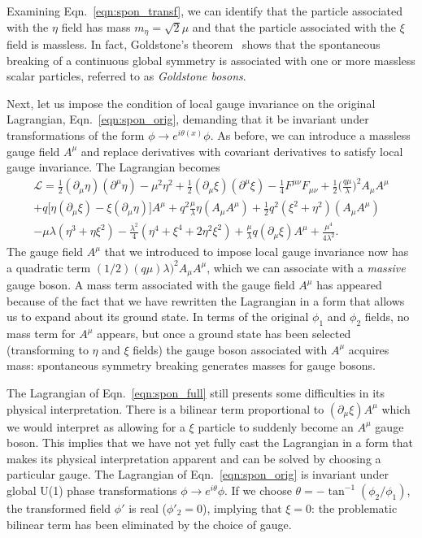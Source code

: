 Examining Eqn.~\ref{eqn:spon_transf}, we can identify that the particle associated with the $\eta$ field has mass $m_\eta = \sqrt{2} \mu$ and that the particle associated with the $\xi$ field is massless.
In fact, Goldstone's theorem~\cite{Goldstone:1962es} shows that the spontaneous breaking of a continuous global symmetry is associated with one or more massless scalar particles, referred to as \emph{Goldstone bosons}.

Next, let us impose the condition of local gauge invariance on the original Lagrangian, Eqn.~\ref{eqn:spon_orig}, demanding that it be invariant under transformations of the form $\phi \to e^{i \theta(x)} \phi$.
As before, we can introduce a massless gauge field $A^\mu$ and replace derivatives with covariant derivatives to satisfy local gauge invariance.
The Lagrangian becomes
\begin{multline} \label{eqn:spon_full}
    \mathcal L = \frac{1}{2} (\partial_\mu \eta)(\partial^\mu \eta) - \mu^2 \eta^2 + \frac{1}{2} (\partial_\mu \xi)(\partial^\mu \xi) 
    - \frac{1}{4} F^{\mu\nu} F_{\mu\nu} + \frac{1}{2} \bigg(\frac{q\mu}{\lambda}\bigg)^2 A_\mu A^\mu \\
    + q \Big[ \eta(\partial_\mu \xi) - \xi (\partial_\mu \eta) \Big] A^\mu + q^2 \frac{\mu}{\lambda} \eta (A_\mu A^\mu)
    + \frac{1}{2} q^2 (\xi^2 + \eta^2)(A_\mu A^\mu) \\
    - \mu \lambda(\eta^3 + \eta \xi^2) - \frac{\lambda^2}{4}(\eta^4 + \xi^4 + 2 \eta^2 \xi^2) 
    + \frac{\mu}{\lambda}q (\partial_\mu \xi) A^\mu
    + \frac{\mu^4}{4 \lambda^2}.
\end{multline}
The gauge field $A^\mu$ that we introduced to impose local gauge invariance now has a quadratic term $(1/2) (q\mu)\lambda)^2 A_\mu A^\mu$, which we can associate with a \emph{massive} gauge boson.
A mass term associated with the gauge field $A^\mu$ has appeared because of the fact that we have rewritten the Lagrangian in a form that allows us to expand about its ground state.
In terms of the original $\phi_1$ and $\phi_2$ fields, no mass term for $A^\mu$ appears, but once a ground state has been selected (transforming to $\eta$ and $\xi$ fields) the gauge boson associated with $A^\mu$ acquires mass: spontaneous symmetry breaking generates masses for gauge bosons.

The Lagrangian of Eqn.~\ref{eqn:spon_full} still presents some difficulties in its physical interpretation.
There is a bilinear term proportional to $(\partial_\mu \xi)A^\mu$ which we would interpret as allowing for a $\xi$ particle to suddenly become an $A^\mu$ gauge boson.
This implies that we have not yet fully cast the Lagrangian in a form that makes its physical interpretation apparent and can be solved by choosing a particular gauge.
The Lagrangian of Eqn.~\ref{eqn:spon_orig} is invariant under global U(1) phase transformations $\phi \to e^{i\theta} \phi$.
If we choose $\theta = - \tan^{-1}(\phi_2/\phi_1)$, the transformed field $\phi'$ is real ($\phi'_2 = 0$), implying that $\xi = 0$: the problematic bilinear term has been eliminated by the choice of gauge.

